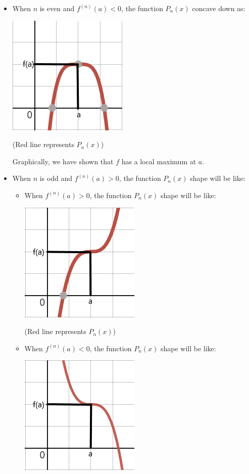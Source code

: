 \documentclass[12pt]{exam}
\begin{document}
\begin{enumerate}
\begin{enumerate}
\begin{itemize}
			    \item When $n$ is even and $f^{(n)}(a)<0$, the function $P_n(x)$ concave down as:
			        \begin{center}
			            \includegraphics[scale=0.75]{Downward-n}
			    
			            (Red line represents $P_n(x)$)
			        \end{center}
			        Graphically, we have shown that $f$ has a local maximum at $a$.
			     
		        \item When $n$ is odd and $f^{(n)}(a)>0$, the function $P_n(x)$ shape will be like:
		            \begin{itemize}
		                \item When $f^{(n)}(a)>0$, the function $P_n(x)$ shape will be like:
		                    \begin{center}
			                    \includegraphics[scale=0.75]{Odd-Positive}
			    
			                    (Red line represents $P_n(x)$)
			                \end{center}
		                \item When $f^{(n)}(a)<0$, the function $P_n(x)$ shape will be like:
		                    \begin{center}
			                    \includegraphics[scale=0.75]{Odd-Negative}
			    

\end{center}
\end{itemize}
\end{itemize}
\end{enumerate}
\end{enumerate}
\end{document}
